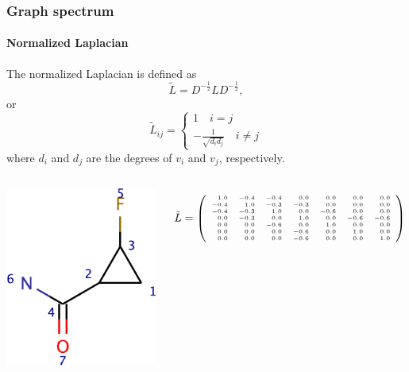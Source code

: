 \documentclass{beamer}
\begin{document}
\begin{frame}
  \frametitle{Graph spectrum}
  \framesubtitle{Normalized Laplacian}
  The normalized Laplacian is defined as
  \[
  \tilde L = D^{-\frac{1}{2}}LD^{-\frac{1}{2}},
  \]
  or
  \[
  \tilde L_{ij} = \begin{cases}
    1\quad i = j\\
    -\frac{1}{\sqrt{d_id_j}}\quad i \not= j
  \end{cases}
  \]
  where $d_i$ and $d_j$ are the degrees of $v_i$ and $v_j$,
  respectively.
  \begin{columns}
    \centerline{\includegraphics[width=1 true in]{test0-crop}}
    \[
    \tilde L = \tiny\left(\begin{array}{rrrrrrr}
1.0&-0.4&-0.4&0.0&0.0&0.0&0.0 \\
-0.4&1.0&-0.3&-0.3&0.0&0.0&0.0 \\
-0.4&-0.3&1.0&0.0&-0.6&0.0&0.0 \\
0.0&-0.3&0.0&1.0&0.0&-0.6&-0.6 \\
0.0&0.0&-0.6&0.0&1.0&0.0&0.0 \\
0.0&0.0&0.0&-0.6&0.0&1.0&0.0 \\
0.0&0.0&0.0&-0.6&0.0&0.0&1.0 \\      
    \end{array}\right)
    \]
  \end{columns}
\end{frame}
\end{document}
